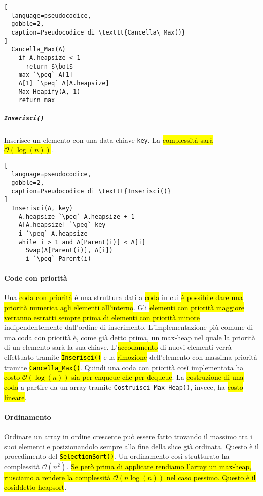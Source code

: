 \documentclass[a4paper,11pt,oneside]{article}
\theoremstyle{plain}
\theoremstyle{definition}
\theoremstyle{remark}
\newcommand{\peq}{$\gets$}
\begin{document}
\begin{lstlisting}[
  language=pseudocodice,
  gobble=2,
  caption=Pseudocodice di \texttt{Cancella\_Max()}
]
  Cancella_Max(A)
    if A.heapsize < 1
      return $\bot$
    max `\peq` A[1]
    A[1] `\peq` A[A.heapsize]
    Max_Heapify(A, 1)
    return max
\end{lstlisting}

\subparagraph{\texttt{Inserisci()}} Inserisce un elemento con una data chiave
\texttt{key}. La \hl{complessità sarà $\mathcal{O}(\log(n))$}.

\begin{lstlisting}[
  language=pseudocodice,
  gobble=2,
  caption=Pseudocodice di \texttt{Inserisci()}
]
  Inserisci(A, key)
    A.heapsize `\peq` A.heapsize + 1
    A[A.heapsize] `\peq` key
    i `\peq` A.heapsize
    while i > 1 and A[Parent(i)] < A[i]
      Swap(A[Parent(i)], A[i])
      i `\peq` Parent(i)
\end{lstlisting}

\paragraph{Code con priorità} Una \hl{coda con priorità} è una struttura dati a
\hl{coda} in cui \hl{è possibile dare una priorità numerica agli elementi
all'interno}. Gli \hl{elementi con priorità maggiore verranno estratti sempre
prima di elementi con priorità minore} indipendentemente dall'ordine di
inserimento. L'implementazione più comune di una coda con priorità è, come già
detto prima, un max-heap nel quale la priorità di un elemento sarà la sua
chiave. L'\hl{accodamento} di nuovi elementi verrà effettuato tramite
\hl{\texttt{Inserisci()}} e la \hl{rimozione} dell'elemento con massima priorità
tramite \hl{\texttt{Cancella\_Max()}}. Quindi una coda con priorità così
implementata ha \hl{costo $\mathcal{O}(\log(n))$ sia per enqueue che per
dequeue}. La \hl{costruzione di una coda} a partire da un array tramite
\texttt{Costruisci\_Max\_Heap()}, invece, ha \hl{costo lineare}.

\paragraph{Ordinamento} Ordinare un array in ordine crescente può essere fatto
trovando il massimo tra i suoi elementi e posizionandolo sempre alla fine della
slice già ordinata. Questo è il procedimento del \hl{\texttt{SelectionSort()}}.
Un ordinamento così strutturato ha complessità $\mathcal{O}(n^2)$. \hl{Se però
prima di applicare rendiamo l'array un max-heap, riusciamo a rendere la
complessità $\mathcal{O}(n\log(n))$ nel caso pessimo. Questo è il cosiddetto
heapsort}.
\end{document}

